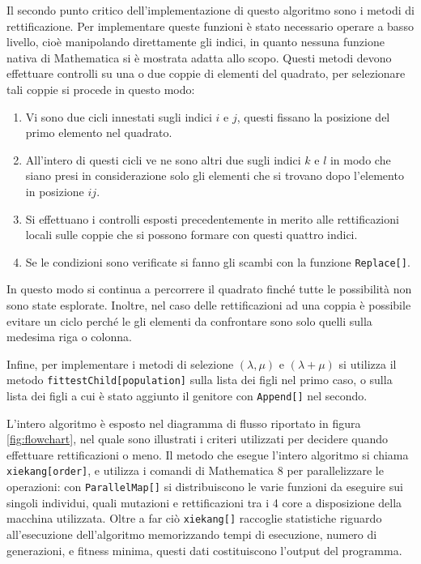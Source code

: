 \documentclass[italian,twoside,twocolumn]{article}
\begin{document}
Il secondo punto critico dell'implementazione di questo algoritmo sono i metodi di rettificazione. Per implementare queste funzioni è stato necessario operare a basso livello, cioè manipolando direttamente gli indici, in quanto nessuna funzione nativa di Mathematica si è mostrata adatta allo scopo. Questi metodi devono effettuare controlli su una o due coppie di elementi del quadrato, per selezionare tali coppie si procede in questo modo: 
\begin{enumerate}
	\item Vi sono due cicli innestati sugli indici  $ i $ e $ j $, questi fissano la posizione del primo elemento nel quadrato.
	\item All'intero di questi cicli ve ne sono altri due sugli indici $ k $ e $ l $ in modo che siano presi in considerazione solo gli elementi che si trovano dopo l'elemento in posizione $ ij $.
	\item Si effettuano i controlli esposti precedentemente in merito alle rettificazioni locali sulle coppie che si possono formare con questi quattro indici.
	\item Se le condizioni sono verificate si fanno gli scambi con la funzione \texttt{Replace[]}.
\end{enumerate}
In questo modo si continua a percorrere il quadrato finché tutte le possibilità non sono state esplorate. Inoltre, nel caso delle rettificazioni ad una coppia è possibile evitare un ciclo perché le gli elementi da confrontare sono solo quelli sulla medesima riga o colonna. 

Infine, per implementare i metodi di selezione $ (\lambda, \mu) $ e $ (\lambda + \mu) $ si utilizza il metodo \texttt{fittestChild[population]} sulla lista dei figli nel primo caso, o sulla lista dei figli a cui è stato aggiunto il genitore con \texttt{Append[]} nel secondo.

L'intero algoritmo è esposto nel diagramma di flusso riportato in figura \ref{fig:flowchart}, nel quale sono illustrati i criteri utilizzati per decidere quando effettuare rettificazioni o meno. Il metodo che esegue l'intero algoritmo si chiama \texttt{xiekang[order]}, e utilizza i comandi di Mathematica 8 per parallelizzare le operazioni: con \texttt{ParallelMap[]} si distribuiscono le varie funzioni da eseguire sui singoli individui, quali mutazioni e rettificazioni tra i 4 core a disposizione della macchina utilizzata. Oltre a far ciò \texttt{xiekang[]} raccoglie statistiche riguardo all'esecuzione dell'algoritmo memorizzando tempi di esecuzione, numero di generazioni, e fitness minima, questi dati costituiscono l'output del programma.
\end{document}
